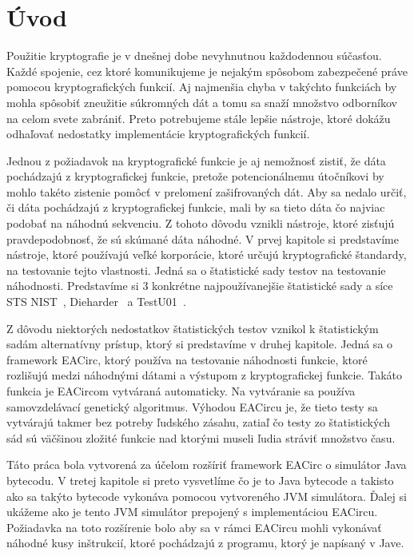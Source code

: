 \chapter*{Úvod}
\label{chap:introduction}

Použitie kryptografie je v dnešnej dobe nevyhnutnou každodennou súčasťou. Každé spojenie, cez ktoré komunikujeme je nejakým spôsobom zabezpečené práve pomocou kryptografických funkcií. Aj najmenšia chyba v takýchto funkciách by mohla spôsobiť zneužitie súkromných dát a tomu sa snaží množstvo odborníkov na celom svete zabrániť. Preto potrebujeme stále lepšie nástroje, ktoré dokážu odhaľovať nedostatky implementácie kryptografických funkcií.

Jednou z požiadavok na kryptografické funkcie je aj nemožnosť zistiť, že dáta pochádzajú z kryptografickej funkcie, pretože potencionálnemu útočníkovi by mohlo takéto zistenie pomôcť v prelomení zašifrovaných dát. Aby sa nedalo určiť, či dáta pochádzajú z kryptografickej funkcie, mali by sa tieto dáta čo najviac podobať na náhodnú sekvenciu. Z tohoto dôvodu vznikli nástroje, ktoré zisťujú pravdepodobnosť, že sú skúmané dáta náhodné. V prvej kapitole si predstavíme nástroje, ktoré používajú veľké korporácie, ktoré určujú kryptografické štandardy, na testovanie tejto vlastnosti. Jedná sa o štatistické sady testov na testovanie náhodnosti. Predstavíme si 3 konkrétne najpoužívanejšie štatistické sady a síce {STS NIST}~\parencite{nist-sts-documentation}, Dieharder~\parencite{dieharder} a TestU01~\parencite{testu01}. 

Z dôvodu niektorých nedostatkov štatistických testov vznikol k štatistickým sadám alternatívny prístup, ktorý si predstavíme v druhej kapitole. Jedná sa o framework EACirc, ktorý používa na testovanie náhodnosti funkcie, ktoré rozlišujú medzi náhodnými dátami a výstupom z kryptografickej funkcie. Takáto funkcia je EACircom vytváraná automaticky. Na vytváranie sa používa samovzdelávací genetický algoritmus. Výhodou EACircu je, že tieto testy sa vytvárajú takmer bez potreby ľudského zásahu, zatiaľ čo testy zo štatistických sád sú väčšinou zložité funkcie nad ktorými museli ľudia stráviť množstvo času.

Táto práca bola vytvorená za účelom rozšíriť framework EACirc o simulátor Java bytecodu. V tretej kapitole si preto vysvetlíme čo je to Java bytecode a takisto ako sa takýto bytecode vykonáva pomocou vytvoreného JVM simulátora. Ďalej si ukážeme ako je tento JVM simulátor prepojený s implementáciou EACircu. Požiadavka na toto rozšírenie bolo aby sa v rámci EACircu mohli vykonávať náhodné kusy inštrukcií, ktoré pochádzajú z programu, ktorý je napísaný v Jave. 

